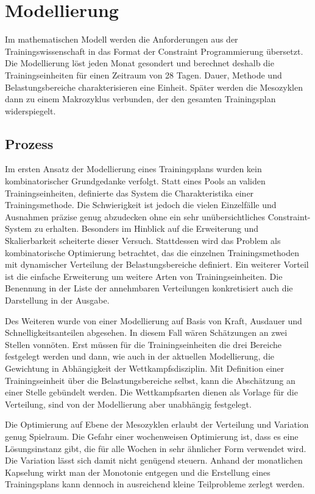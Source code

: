 \chapter{Modellierung}
\label{sec:modellierung}
Im mathematischen Modell werden die Anforderungen aus der Trainingswissenschaft in das Format der Constraint Programmierung übersetzt. Die Modellierung löst jeden Monat gesondert und berechnet deshalb die Trainingseinheiten für einen Zeitraum von 28 Tagen. Dauer, Methode und Belastungsbereiche charakterisieren eine Einheit. Später werden die Mesozyklen dann zu einem Makrozyklus verbunden, der den gesamten Trainingsplan widerspiegelt.

\section{Prozess}
Im ersten Ansatz der Modellierung eines Trainingsplans wurden kein kombinatorischer Grundgedanke verfolgt. Statt eines Pools an validen Trainingseinheiten, definierte das System die Charakteristika einer Trainingsmethode. Die Schwierigkeit ist jedoch die vielen Einzelfälle und Ausnahmen präzise genug abzudecken ohne ein sehr unübersichtliches Constraint-System zu erhalten. Besonders im Hinblick auf die Erweiterung und Skalierbarkeit scheiterte dieser Versuch. Stattdessen wird das Problem als kombinatorische Optimierung betrachtet, das die einzelnen Trainingsmethoden mit dynamischer Verteilung der Belastungsbereiche definiert. Ein weiterer Vorteil ist die einfache Erweiterung um weitere Arten von Trainingseinheiten. Die Benennung in der Liste der annehmbaren Verteilungen konkretisiert auch die Darstellung in der Ausgabe. \par
Des Weiteren wurde von einer Modellierung auf Basis von Kraft, Ausdauer und Schnelligkeitsanteilen abgesehen. In diesem Fall wären Schätzungen an zwei Stellen vonnöten. Erst müssen für die Trainingseinheiten die drei Bereiche festgelegt werden und dann, wie auch in der aktuellen Modellierung, die Gewichtung in Abhängigkeit der Wettkampfsdisziplin. Mit Definition einer Trainingseinheit über die Belastungsbereiche selbst, kann die Abschätzung an einer Stelle gebündelt werden. Die Wettkampfsarten dienen als Vorlage für die Verteilung, sind von der Modellierung aber unabhängig festgelegt. \par
Die Optimierung auf Ebene der Mesozyklen erlaubt der Verteilung und Variation genug Spielraum. Die Gefahr einer wochenweisen Optimierung ist, dass es eine Lösungsinstanz gibt, die für alle Wochen in sehr ähnlicher Form verwendet wird. Die Variation lässt sich damit nicht genügend steuern. Anhand der monatlichen Kapselung wirkt man der Monotonie entgegen und die Erstellung eines Trainingsplans kann dennoch in ausreichend kleine Teilprobleme zerlegt werden.

